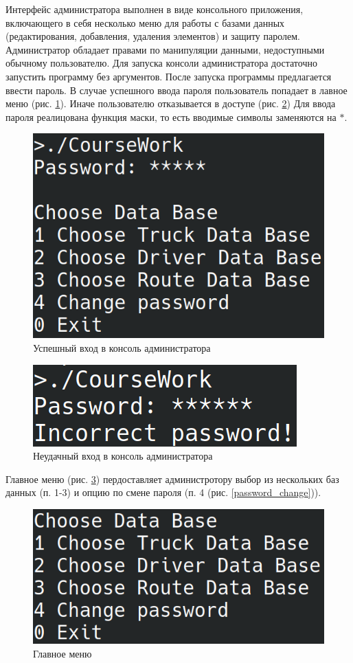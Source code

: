 Интерфейс администратора выполнен в виде консольного приложения, 
включающего в себя несколько меню для работы с 
базами данных 
(редактирования, добавления, удаления элементов) 
и защиту паролем. 
Администратор обладает правами по манипуляции данными, 
недоступными обычному пользователю. 
Для запуска консоли администратора достаточно 
запустить программу без аргументов. 
После запуска программы предлагается ввести пароль.
В случае успешного ввода пароля пользователь
попадает в лавное меню
(рис. \ref{password_good}).
Иначе пользователю отказывается в доступе
(рис. \ref{password_bad})
Для ввода пароля реалицована функция маски,
то есть вводимые символы заменяются на $ * $.

\begin{figure}[hpt!]
    \centering
    \includegraphics[width=0.7\linewidth]{photo/interface/password_good}
    \caption{Успешный вход в консоль администратора}
    \label{password_good}
\end{figure}

\begin{figure}[hpt!]
    \centering
    \includegraphics[width=0.7\linewidth]{photo/interface/password_bad}
    \caption{Неудачный вход в консоль администратора}
    \label{password_bad}
\end{figure}

Главное меню (рис. \ref{menu_main}) пердоставляет администротору 
выбор из нескольких баз данных (п. 1-3) и
опцию по смене пароля (п. 4 (рис. \ref{password_change})).

\begin{figure}[H]
    \centering
    \includegraphics[width=0.7\linewidth]{photo/interface/menu_main}
    \caption{Главное меню}
    \label{menu_main}
\end{figure}

